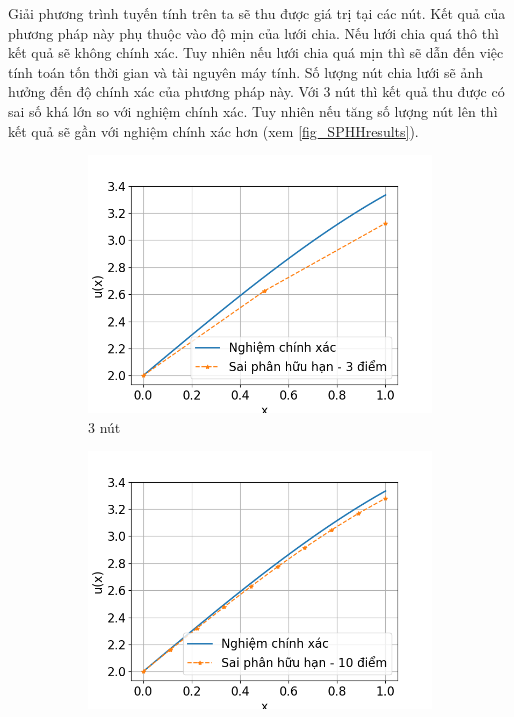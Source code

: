 Giải phương trình tuyến tính trên ta sẽ thu được giá trị tại các nút. Kết quả của phương pháp này phụ thuộc vào độ mịn của lưới chia. Nếu lưới chia quá thô thì kết quả sẽ không chính xác. Tuy nhiên nếu lưới chia quá mịn thì sẽ dẫn đến việc tính toán tốn thời gian và tài nguyên máy tính. Số lượng nút chia lưới sẽ ảnh hưởng đến độ chính xác của phương pháp này. Với 3 nút thì kết quả thu được có sai số khá lớn so với nghiệm chính xác. Tuy nhiên nếu tăng số lượng nút lên thì kết quả sẽ gần với nghiệm chính xác hơn (xem \cref{fig_SPHHresults}).

\begin{figure}[htbp]
    \centering
    \begin{subfigure}[b]{0.3\linewidth}
        \centering
        \includegraphics[width=\linewidth]{Tuan6/figure/SPHH_3p.png}
        \caption{3 nút}
        \label{fig:SPHH_3p}
    \end{subfigure}\hfill
    \begin{subfigure}[b]{0.3\linewidth}
        \centering
        \includegraphics[width=\linewidth]{Tuan6/figure/SPHH_10p.png}

\end{subfigure}
\end{figure}
